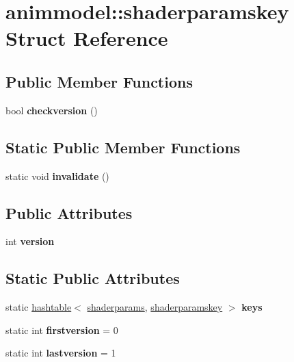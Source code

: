 \hypertarget{structanimmodel_1_1shaderparamskey}{}\section{animmodel\+:\+:shaderparamskey Struct Reference}
\label{structanimmodel_1_1shaderparamskey}
\subsection*{Public Member Functions}
\begin{DoxyCompactItemize}
\item 
\mbox{\label{structanimmodel_1_1shaderparamskey_ac9a331e11a0bab1123f104f84eeebef2}} 
bool {\bfseries checkversion} ()
\end{DoxyCompactItemize}
\subsection*{Static Public Member Functions}
\begin{DoxyCompactItemize}
\item 
\mbox{\label{structanimmodel_1_1shaderparamskey_a36d16ff726c67da36befafae53ffcefc}} 
static void {\bfseries invalidate} ()
\end{DoxyCompactItemize}
\subsection*{Public Attributes}
\begin{DoxyCompactItemize}
\item 
\mbox{\label{structanimmodel_1_1shaderparamskey_ae4ee0072bcbb70fdf8bf0c9110881a14}} 
int {\bfseries version}
\end{DoxyCompactItemize}
\subsection*{Static Public Attributes}
\begin{DoxyCompactItemize}
\item 
\mbox{\label{structanimmodel_1_1shaderparamskey_a693b0ae54b480aaead967629da452a49}} 
static \hyperlink{structhashtable}{hashtable}$<$ \hyperlink{structanimmodel_1_1shaderparams}{shaderparams}, \hyperlink{structanimmodel_1_1shaderparamskey}{shaderparamskey} $>$ {\bfseries keys}
\item 
\mbox{\label{structanimmodel_1_1shaderparamskey_a1a839e5eefb0d350405ea29d8c4b8de5}} 
static int {\bfseries firstversion} = 0
\item 
\mbox{\label{structanimmodel_1_1shaderparamskey_af2862a40130c976cf016348d31869dfc}} 
static int {\bfseries lastversion} = 1
\end{DoxyCompactItemize}


